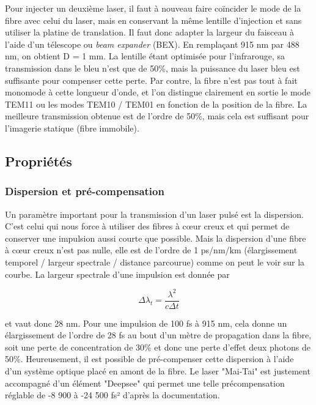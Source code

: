 Pour injecter un deuxième laser, il faut à nouveau faire coïncider le mode de la fibre avec celui du laser, mais en conservant la même lentille d'injection et sans utiliser la platine de translation. Il faut donc adapter la largeur du faisceau à l'aide d'un télescope ou \emph{beam expander} (BEX). En remplaçant 915 nm par 488 nm, on obtient D = 1 mm. La lentille étant optimisée pour l'infrarouge, sa transmission dans le bleu n'est que de 50\%, mais la puissance du laser bleu est suffisante pour compenser cette perte. Par contre, la fibre n'est pas tout à fait monomode à cette longueur d'onde, et l'on distingue clairement en sortie le mode TEM11 ou les modes TEM10 / TEM01 en fonction de la position de la fibre. La meilleure transmission obtenue est de l'ordre de 50\%, mais cela est suffisant pour l'imagerie statique (fibre immobile).


\subsection{Propriétés}


\subsubsection{Dispersion et pré-compensation}

Un paramètre important pour la transmission d'un laser pulsé est la dispersion. C'est celui qui nous force à utiliser des fibres à cœur creux et qui permet de conserver une impulsion aussi courte que possible. Mais la dispersion d'une fibre à cœur creux n'est pas nulle, elle est de l'ordre de 1 ps/nm/km (élargissement temporel / largeur spectrale / distance parcourue) comme on peut le voir sur la courbe. La largeur spectrale d'une impulsion est donnée par

$$
\Delta \lambda_t = \frac{\lambda^2}{c\Delta t}
$$

et vaut donc 28 nm. Pour une impulsion de 100 fs à 915 nm, cela donne un élargissement de l'ordre de 28 fs au bout d'un mètre de propagation dans la fibre, soit une perte de concentration de 30\% et donc une perte d'effet deux photons de 50\%. Heureusement, il est possible de pré-compenser cette dispersion à l'aide d'un système optique placé en amont de la fibre. Le laser "Mai-Tai" est justement accompagné d'un élément "Deepsee" qui permet une telle précompensation réglable de -8 900 à -24 500 fs² d'après la documentation.


